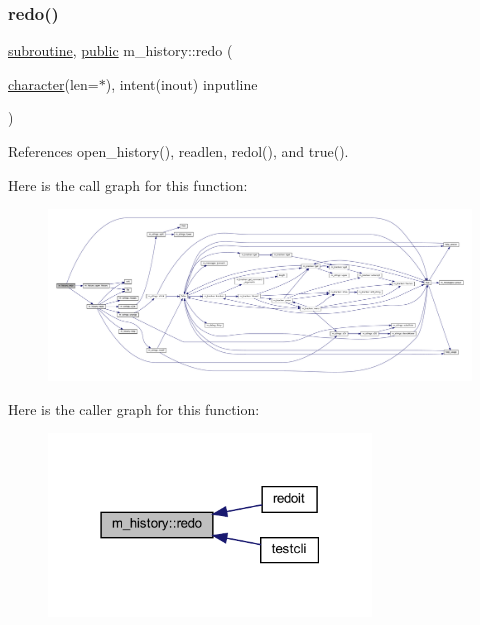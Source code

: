\subsubsection{\texorpdfstring{redo()}{redo()}}
{\footnotesize\ttfamily \hyperlink{M__stopwatch_83_8txt_acfbcff50169d691ff02d4a123ed70482}{subroutine}, \hyperlink{M__stopwatch_83_8txt_a2f74811300c361e53b430611a7d1769f}{public} m\+\_\+history\+::redo (\begin{DoxyParamCaption}\item[{\hyperlink{option__stopwatch_83_8txt_abd4b21fbbd175834027b5224bfe97e66}{character}(len=$\ast$), intent(inout)}]{inputline }\end{DoxyParamCaption})}



References open\+\_\+history(), readlen, redol(), and true().

Here is the call graph for this function\+:
\nopagebreak
\begin{figure}[H]
\begin{center}
\leavevmode
\includegraphics[width=350pt]{namespacem__history_a1abbc2c426b89526939d4389c9d3e391_cgraph}
\end{center}
\end{figure}
Here is the caller graph for this function\+:
\nopagebreak
\begin{figure}[H]
\begin{center}
\leavevmode
\includegraphics[width=243pt]{namespacem__history_a1abbc2c426b89526939d4389c9d3e391_icgraph}
\end{center}
\end{figure}
\mbox{\label{namespacem__history_a155404b1f975ae6fe778f836c043eeb2}} 
